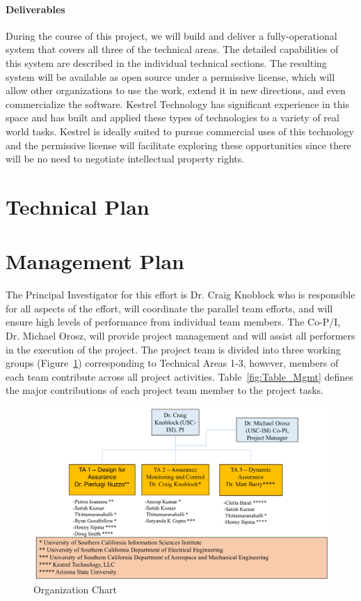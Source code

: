 \documentclass[12pt]{dod-blank}
\begin{document}
\paragraph{Deliverables}
During the course of this project, we will build and deliver a fully-operational system that covers all three of the technical areas.  The detailed capabilities of this system are described in the individual technical sections.  The resulting system will be available as open source under a permissive license, which will allow other organizations to use the work, extend it in new directions, and even commercialize the software.  Kestrel Technology has significant experience in this space and has built and applied these types of technologies to a variety of real world tasks.  Kestrel is ideally suited to pursue commercial uses of this technology and the permissive license will facilitate exploring these opportunities since there will be no need to negotiate intellectual property rights.  

\newpage
\section{Technical Plan}



\clearpage
\newpage


\section{Management Plan}


The Principal Investigator for this effort is Dr. Craig Knoblock who is responsible for all aspects of the effort, will coordinate the parallel team efforts, and will ensure high levels of performance from individual team members.  The Co-P/I, Dr. Michael Orosz, will provide project management and will assist all performers in the execution of the project.    The project team is divided into three working groups (Figure~\ref{fig:org_chart}) corresponding to Technical Areas 1-3, however, members of each team contribute across all project activities.   Table~\ref{fig:Table_Mgmt} defines the major contributions of each project team member to the project tasks.

\begin{figure}[tbhp]
\includegraphics[width=6.0in]{./org-chart2.png}
\caption{\small Organization Chart}
\label{fig:org_chart}
\end{figure}
\end{document}
